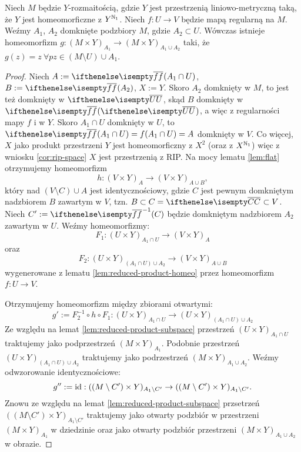 \begin{lem} \label{lem:manifold-homeo}
  Niech $M$ będzie $Y$-rozmaitością, gdzie $Y$ jest przestrzenią liniowo-metryczną taką, że $Y$ jest homeomorficzne z $Y^{\mathbb{N}_1}$. Niech $f: U \to V$ będzie mapą regularną na $M$. Weźmy $A_1$, $A_2$ domknięte podzbiory $M$, gdzie $A_2 \subset U$. Wówczas istnieje homeomorfizm $g: (M\times Y)_{A_1} \to (M\times Y)_{A_1 \cup A_2}$ taki, że $g(z) = z\ \forall pz \in (M\setminus U) \cup A_1$.
  
  \begin{proof}
    Niech $A := \cl{f}(A_1 \cap U)$, $B := \cl{f}(A_2)$, $X := Y$. Skoro $A_2$ domknięty w $M$, to jest też domknięty w $\cl U$, skąd $B$ domknięty w $\cl{f}(\cl U)$, a więc z regularności mapy $f$ i w $Y$. Skoro $A_1 \cap U$ domknięty w $U$, to $\cl{f}(A_1 \cap U) = f(A_1 \cap U) = A$ domknięty w $V$. Co więcej, $X$ jako produkt przestrzeni $Y$ jest homeomorficzny z $X^2$ (oraz z $X^{\mathbb{N}_1}$) więc z wniosku \ref{cor:rip-space} $X$ jest przestrzenią z RIP. Na mocy lematu \ref{lem:flat} otrzymujemy homeomorfizm
    \[
      h: (V\times Y)_{A} \to (V\times Y)_{A\cup B},
    \]
    który nad $(V\setminus C)\cup A$ jest identycznościowy, gdzie $C$ jest pewnym domkniętym nadzbiorem $B$ zawartym w $V$, tzn. $B \subset C = \cl C \subset V$. Niech $C' := \cl{f}^{-1}(C)$ będzie domkniętym nadzbiorem $A_2$ zawartym w $U$.
    Weźmy homeomorfizmy:
    \[
      F_1: (U\times Y)_{A_1 \cap U} \to (V\times Y)_A
    \]
    oraz
    \[
      F_2: (U\times Y)_{(A_1 \cap U)\cup A_2} \to (V\times Y)_{A\cup B}
    \]
    wygenerowane z lematu \ref{lem:reduced-product-homeo} przez homeomorfizm $f: U\to V$.

    Otrzymujemy homeomorfizm między zbiorami otwartymi:
    \[
      g' := F_2^{-1} \circ h \circ F_1: (U\times Y)_{A_1 \cap U} \to (U\times Y)_{(A_1\cap U) \cup A_2}
    \]
    Ze względu na lemat \ref{lem:reduced-product-subspace} przestrzeń $(U\times Y)_{A_1 \cap U}$ traktujemy jako podprzestrzeń $(M\times Y)_{A_1}$. Podobnie przestrzeń $(U\times Y)_{(A_1\cap U)\cup A_2}$ traktujemy jako podrzestrzeń $(M\times Y)_{A_1\cup A_2}$.
    Weźmy odwzorowanie identycznościowe:
    \[
      g'' := \operatorname{id}: ((M\setminus C')\times Y)_{A_1\setminus C'} \to ((M\setminus C')\times Y)_{A_1\setminus C'}.
    \]
    Znowu ze względu na lemat \ref{lem:reduced-product-subspace} przsetrzeń $((M\setminus C')\times Y)_{A_1\setminus C'}$ traktujemy jako otwarty podzbiór w przestrzeni $(M\times Y)_{A_1}$ w dziedzinie oraz jako otwarty podzbiór przestrzeni $(M\times Y)_{A_1\cup A_2}$ w obrazie.
    

\end{proof}
\end{lem}
